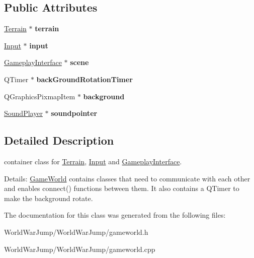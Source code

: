 \subsection*{Public Attributes}
\begin{DoxyCompactItemize}
\item 
\hyperlink{class_terrain}{Terrain} $\ast$ {\bfseries terrain}\hypertarget{class_game_world_a97a0e2bf2693f10e7ab7481ada618191}{}\label{class_game_world_a97a0e2bf2693f10e7ab7481ada618191}

\item 
\hyperlink{class_input}{Input} $\ast$ {\bfseries input}\hypertarget{class_game_world_af51a9a6f7f2f318a7f4842bc7ddddf67}{}\label{class_game_world_af51a9a6f7f2f318a7f4842bc7ddddf67}

\item 
\hyperlink{class_gameplay_interface}{Gameplay\+Interface} $\ast$ {\bfseries scene}\hypertarget{class_game_world_a470317d29e5b698b1e08dc983d78ff50}{}\label{class_game_world_a470317d29e5b698b1e08dc983d78ff50}

\item 
Q\+Timer $\ast$ {\bfseries back\+Ground\+Rotation\+Timer}\hypertarget{class_game_world_a12fff5decf2e34382c409923ec6f4668}{}\label{class_game_world_a12fff5decf2e34382c409923ec6f4668}

\item 
Q\+Graphics\+Pixmap\+Item $\ast$ {\bfseries background}\hypertarget{class_game_world_a42c3f3a06320763c952771c93f49489d}{}\label{class_game_world_a42c3f3a06320763c952771c93f49489d}

\item 
\hyperlink{class_sound_player}{Sound\+Player} $\ast$ {\bfseries soundpointer}\hypertarget{class_game_world_a133678d6bc4754bff909f0e744923549}{}\label{class_game_world_a133678d6bc4754bff909f0e744923549}

\end{DoxyCompactItemize}


\subsection{Detailed Description}
container class for \hyperlink{class_terrain}{Terrain}, \hyperlink{class_input}{Input} and \hyperlink{class_gameplay_interface}{Gameplay\+Interface}. 

Details\+: \hyperlink{class_game_world}{Game\+World} contains classes that need to communicate with each other and enables connect() functions between them. It also contains a Q\+Timer to make the background rotate. 

The documentation for this class was generated from the following files\+:\begin{DoxyCompactItemize}
\item 
World\+War\+Jump/\+World\+War\+Jump/gameworld.\+h\item 
World\+War\+Jump/\+World\+War\+Jump/gameworld.\+cpp\end{DoxyCompactItemize}
